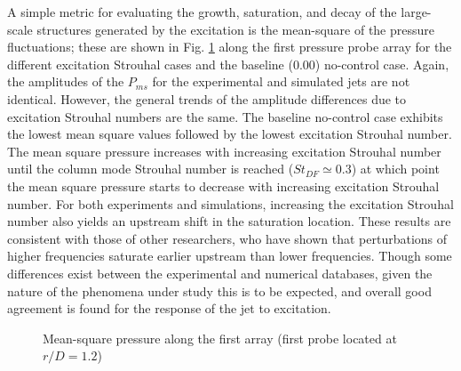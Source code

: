\documentclass[english]{aiaa-tc}
\begin{document}
A simple metric for evaluating the growth, saturation, and decay of the large-scale structures generated by the excitation is the mean-square of the pressure fluctuations; these are shown in Fig. \ref{pms} along the first pressure probe array for the different excitation Strouhal cases and the baseline (0.00) no-control case. Again, the amplitudes of the $P_{ms}$ for the experimental and simulated jets are not identical. However, the general trends of the amplitude differences due to excitation Strouhal numbers are the same. The baseline no-control case exhibits the lowest mean square values followed by the lowest excitation Strouhal number. The mean square pressure increases with increasing excitation Strouhal number until the column mode Strouhal number is reached ($St_{DF} \simeq 0.3$) at which point the mean square pressure starts to decrease with increasing excitation Strouhal number. For both experiments and simulations, increasing the excitation Strouhal number also yields an upstream shift in the saturation location. These results are consistent with those of other researchers, who have shown that perturbations of higher frequencies saturate earlier upstream than lower frequencies\cite{Suzuki2006,Ukeiley2004}. Though some differences exist between the experimental and numerical databases, given the nature of the phenomena under study this is to be expected, and overall good agreement is found for the response of the jet to excitation. 
 
\begin{figure}
\centering{}
\caption{Mean-square pressure along the first array (first probe located at $r/D=1.2$)}\label{pms}
\end{figure}
\end{document}
